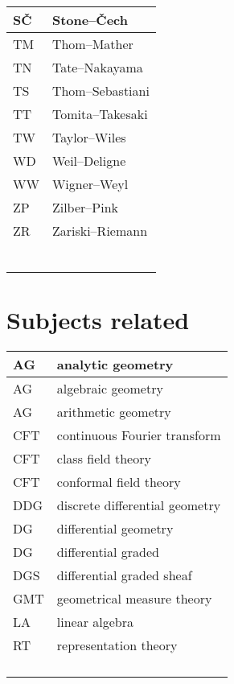 \documentclass{amsart}
\numberwithin{equation}{section}
\theoremstyle{plain}
\numberwithin{equation}{section}
\theoremstyle{remark}
\begin{document}
\begin{longtable}{l|l}
SČ & Stone--Čech\\ \hline
TM & Thom--Mather\\ \hline
TN & Tate--Nakayama\\ \hline
TS & Thom--Sebastiani\\ \hline
TT & Tomita--Takesaki\\ \hline
TW & Taylor--Wiles\\ \hline
WD & Weil--Deligne\\ \hline
WW & Wigner--Weyl\\ \hline
ZP & Zilber--Pink\\ \hline
ZR & Zariski--Riemann\\ \hline
 & \\ \hline
 & \\ \hline
 & \\ \hline
 & \\ \hline
 & \\ \hline
 & \\ \hline
\end{longtable}

\section{Subjects related}

\begin{longtable}{l|l}
\hline
AG & analytic geometry \\ \hline
AG & algebraic geometry \\ \hline
AG & arithmetic geometry \\ \hline
CFT  & continuous Fourier transform\\ \hline
CFT & class field theory\\ \hline
CFT & conformal field theory\\ \hline
DDG & discrete differential geometry\\ \hline
DG & differential geometry\\ \hline
DG & differential graded\\ \hline
DGS & differential graded sheaf\\ \hline
GMT  & geometrical measure theory\\ \hline
LA & linear algebra  \\ \hline
RT & representation theory\\ \hline
 & \\ \hline
 & \\ \hline
 & \\ \hline
 & \\ \hline
\end{longtable}
\end{document}
